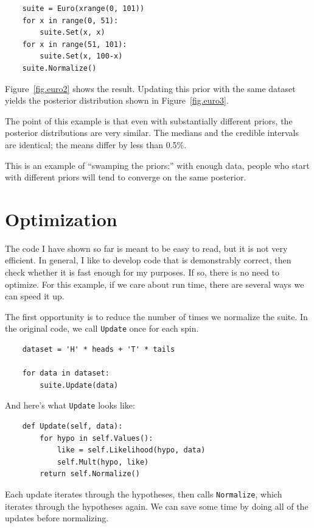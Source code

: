 \documentclass[12pt]{book}
\begin{document}
\begin{verbatim}
    suite = Euro(xrange(0, 101))
    for x in range(0, 51):
        suite.Set(x, x)
    for x in range(51, 101):
        suite.Set(x, 100-x) 
    suite.Normalize()
\end{verbatim}

Figure~\ref{fig.euro2} shows the result.  Updating this prior
with the same dataset yields the posterior distribution shown
in Figure~\ref{fig.euro3}.

The point of this example is that even with substantially different
priors, the posterior distributions are very similar.  The medians
and the credible intervals are identical; the means differ by
less than 0.5\%.

This is an example of ``swamping the priors:'' with enough
data, people who start with different priors will tend to
converge on the same posterior.


\section{Optimization}
\label{optimization}

The code I have shown so far is meant to be easy to read, but it
is not very efficient.  In general, I like to develop code that
is demonstrably correct, then check whether it is fast enough for
my purposes.  If so, there is no need to optimize.
For this example, if we care about run time,
there are several ways we can speed it up.

The first opportunity is to reduce the number of times we
normalize the suite.
In the original code, we call \verb"Update" once for each spin.

\begin{verbatim}
    dataset = 'H' * heads + 'T' * tails

    for data in dataset:
        suite.Update(data)
\end{verbatim}

And here's what \verb"Update" looks like:

\begin{verbatim}
    def Update(self, data):
        for hypo in self.Values():
            like = self.Likelihood(hypo, data)
            self.Mult(hypo, like)
        return self.Normalize()
\end{verbatim}

Each update iterates through the hypotheses, then calls \verb"Normalize",
which iterates through the hypotheses again.  We can save some
time by doing all of the updates before normalizing.
\end{document}
